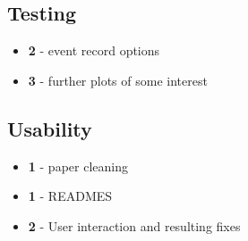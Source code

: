 \documentclass[]{Photos_interface_design}
\begin{document}
\subsection*{Testing}
\begin{itemize}
  \item[\ding{111}]{\bf 2} - event record options
  \item[\ding{111}]{\bf 3} - further plots of some interest
\end{itemize}

\subsection*{Usability}
\begin{itemize}
  \item[\ding{111}]{\bf 1} - paper cleaning
  \item[\ding{111}]{\bf 1} - READMES
  \item[\ding{111}]{\bf 2} - User interaction and resulting fixes
\end{itemize}
\end{document}
